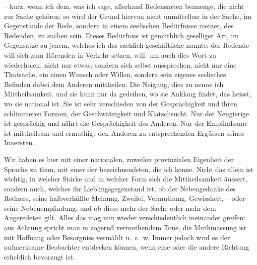 – kurz, wenn ich dem, was ich sage, allerhand Redensarten beimenge, die nicht zur Sache gehören: so wird der Grund hiervon nicht unmittelbar in der Sache, im Gegenstande der Rede, sondern in einem seelischen Bedürfnisse meiner, des Redenden, zu suchen sein. Dieses Be\label{fp.454}dürfniss ist gemüthlich geselliger Art, im Gegensatze zu jenem, welches ich das sachlich geschäftliche nannte: der Redende will sich zum Hörenden in  Verkehr setzen, will, um auch dies Wort zu wiederholen, nicht nur etwas, sondern sich selbst aussprechen, nicht nur eine Thatsache, ein  einen Wunsch oder Willen, sondern sein eigenes seelisches Befinden dabei dem Anderen mittheilen. Die Neigung, dies zu  nenne ich Mittheilsamkeit, und sie kann nur da gedeihen, wo sie Anklang findet, das heisst, wo sie national ist. Sie ist sehr verschieden von der Gesprächigkeit und ihren schlimmeren Formen, der Geschwätzigkeit und Klatschsucht. Nur der Neugierige ist gesprächig und nährt die Gesprächigkeit des Anderen. Nur der Empfindsame ist mittheilsam und ermuthigt den Anderen zu entsprechenden Ergüssen seines Innersten. 

Wir haben es hier mit einer  nationalen, zuweilen provinzialen Eigenheit der Sprache zu thun, mit einer der bezeichnendsten, die ich kenne. Nicht \label{sp.473} das allein ist wichtig, in welcher Stärke und in welcher Form sich die Mittheilsamkeit äussert, sondern auch, welches ihr Lieblingsgegenstand ist, ob der Nebengedanke des Redners, seine halbverhüllte Meinung, Zweifel, Vermuthung, Gewissheit, – oder seine Nebenempfindung, und ob diese mehr der Sache oder mehr dem Angeredeten gilt. Alles das mag nun wieder verschiedentlich ineinander greifen: aus Achtung spricht man in zögernd vermuthendem Tone, die Muthmassung ist mit Hoffnung oder Besorgniss vermählt u.~s.~w. Immer jedoch wird es der aufmerksame Beobachter entdecken können, wenn eine oder die andere Richtung erheblich bevorzugt ist.



